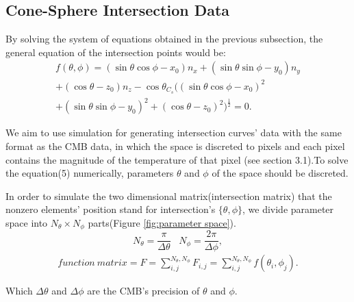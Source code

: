 \documentclass{article}
\begin{document}
\begin{multicols}{2}
\subsection{Cone-Sphere Intersection Data}
By solving the system of equations obtained in the previous subsection, the general equation of the intersection points would be:
\begin{multline}
       f(\theta,\phi) = (\sin{\theta} \cos{\phi} - x_0) n_x + (\sin{\theta} \sin{\phi}- y_0) n_y\\ + (\cos{\theta} - z_0) n_z - \cos{\theta_{C_s}} \bigg((\sin{\theta} \cos{\phi} - x_0)^2 \\ + ( \sin{\theta} \sin{\phi}- y_0)^2 + (\cos{\theta} - z_0)^2\bigg)^{\frac{1}{2}} = 0 .
\end{multline}

We aim to use simulation for generating intersection curves' data with the same format as the CMB data, in which the space is discreted to pixels and each pixel contains the magnitude of the temperature of that pixel (see section 3.1).To solve the equation(5) numerically, parameters $\theta$ and $\phi$ of the space should be discreted. 

In order to simulate the two dimensional matrix(intersection matrix) that the nonzero elements’ position stand for intersection’s $\{\theta,\phi\}$, we divide parameter space into $N_{\theta}\times N_{\phi}$ parts(Figure \ref{fig:parameter space}).
\begin{equation*}
    N_{\theta} = \frac{\pi}{\Delta \theta}\;\;\;N_{\phi} = \frac{2\pi}{\Delta \phi},
\end{equation*}
\begin{multline}
   function\: matrix = F = \sum_{i,j}^{N_{\theta},N_{\phi}} F_{i,j} = \sum_{i,j}^{N_{\theta},N_{\phi}} f({\theta_i,\phi_j}).
\end{multline}

Which $\Delta \theta$ and $\Delta \phi$ are the CMB’s precision of $\theta$ and $\phi$.


\end{multicols}
\end{document}
